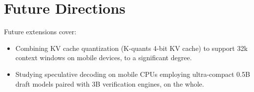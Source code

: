 \documentclass[12pt,a4paper,oneside]{report}
\begin{document}
    \section{Future Directions}
    Future extensions cover:
    \begin{itemize}
        \item Combining KV cache quantization (K-quants 4-bit KV cache) to support 32k context windows on mobile devices, to a significant degree.
        \item Studying speculative decoding on mobile CPUs employing ultra-compact 0.5B draft models paired with 3B verification engines, on the whole.
    \end{itemize}

\end{document}
